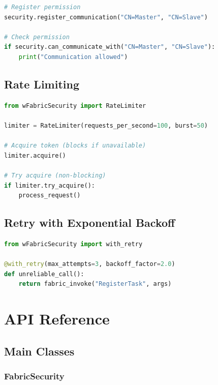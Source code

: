 \documentclass[12pt,a4paper]{report}
\begin{document}
\begin{lstlisting}[language=python, caption={Communication Permissions}]
# Register permission
security.register_communication("CN=Master", "CN=Slave")

# Check permission
if security.can_communicate_with("CN=Master", "CN=Slave"):
    print("Communication allowed")
\end{lstlisting}

\section{Rate Limiting}

\begin{lstlisting}[language=python, caption={Rate Limiting}]
from wFabricSecurity import RateLimiter

limiter = RateLimiter(requests_per_second=100, burst=50)

# Acquire token (blocks if unavailable)
limiter.acquire()

# Try acquire (non-blocking)
if limiter.try_acquire():
    process_request()
\end{lstlisting}

\section{Retry with Exponential Backoff}

\begin{lstlisting}[language=python, caption={Retry Logic}]
from wFabricSecurity import with_retry

@with_retry(max_attempts=3, backoff_factor=2.0)
def unreliable_call():
    return fabric_invoke("RegisterTask", args)
\end{lstlisting}

\cleardoublepage

\chapter{API Reference}
\cleardoublepage

\section{Main Classes}

\subsection{FabricSecurity}
\end{document}
